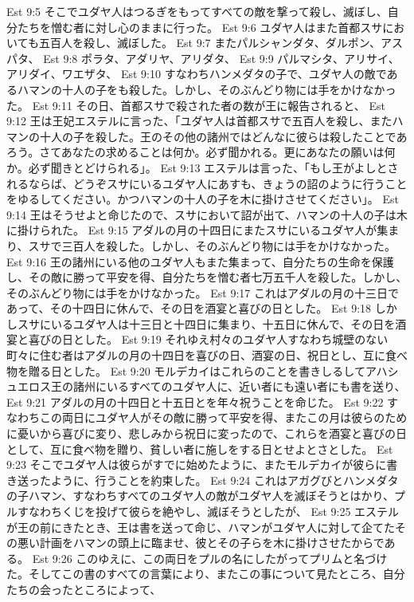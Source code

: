Est 9:5  そこでユダヤ人はつるぎをもってすべての敵を撃って殺し、滅ぼし、自分たちを憎む者に対し心のままに行った。
Est 9:6  ユダヤ人はまた首都スサにおいても五百人を殺し、滅ぼした。
Est 9:7  またパルシャンダタ、ダルポン、アスパタ、
Est 9:8  ポラタ、アダリヤ、アリダタ、
Est 9:9  パルマシタ、アリサイ、アリダイ、ワエザタ、
Est 9:10  すなわちハンメダタの子で、ユダヤ人の敵であるハマンの十人の子をも殺した。しかし、そのぶんどり物には手をかけなかった。
Est 9:11  その日、首都スサで殺された者の数が王に報告されると、
Est 9:12  王は王妃エステルに言った、「ユダヤ人は首都スサで五百人を殺し、またハマンの十人の子を殺した。王のその他の諸州ではどんなに彼らは殺したことであろう。さてあなたの求めることは何か。必ず聞かれる。更にあなたの願いは何か。必ず聞きとどけられる」。
Est 9:13  エステルは言った、「もし王がよしとされるならば、どうぞスサにいるユダヤ人にあすも、きょうの詔のように行うことをゆるしてください。かつハマンの十人の子を木に掛けさせてください」。
Est 9:14  王はそうせよと命じたので、スサにおいて詔が出て、ハマンの十人の子は木に掛けられた。
Est 9:15  アダルの月の十四日にまたスサにいるユダヤ人が集まり、スサで三百人を殺した。しかし、そのぶんどり物には手をかけなかった。
Est 9:16  王の諸州にいる他のユダヤ人もまた集まって、自分たちの生命を保護し、その敵に勝って平安を得、自分たちを憎む者七万五千人を殺した。しかし、そのぶんどり物には手をかけなかった。
Est 9:17  これはアダルの月の十三日であって、その十四日に休んで、その日を酒宴と喜びの日とした。
Est 9:18  しかしスサにいるユダヤ人は十三日と十四日に集まり、十五日に休んで、その日を酒宴と喜びの日とした。
Est 9:19  それゆえ村々のユダヤ人すなわち城壁のない町々に住む者はアダルの月の十四日を喜びの日、酒宴の日、祝日とし、互に食べ物を贈る日とした。
Est 9:20  モルデカイはこれらのことを書きしるしてアハシュエロス王の諸州にいるすべてのユダヤ人に、近い者にも遠い者にも書を送り、
Est 9:21  アダルの月の十四日と十五日とを年々祝うことを命じた。
Est 9:22  すなわちこの両日にユダヤ人がその敵に勝って平安を得、またこの月は彼らのために憂いから喜びに変り、悲しみから祝日に変ったので、これらを酒宴と喜びの日として、互に食べ物を贈り、貧しい者に施しをする日とせよとさとした。
Est 9:23  そこでユダヤ人は彼らがすでに始めたように、またモルデカイが彼らに書き送ったように、行うことを約束した。
Est 9:24  これはアガグびとハンメダタの子ハマン、すなわちすべてのユダヤ人の敵がユダヤ人を滅ぼそうとはかり、プルすなわちくじを投げて彼らを絶やし、滅ぼそうとしたが、
Est 9:25  エステルが王の前にきたとき、王は書を送って命じ、ハマンがユダヤ人に対して企てたその悪い計画をハマンの頭上に臨ませ、彼とその子らを木に掛けさせたからである。
Est 9:26  このゆえに、この両日をプルの名にしたがってプリムと名づけた。そしてこの書のすべての言葉により、またこの事について見たところ、自分たちの会ったところによって、
